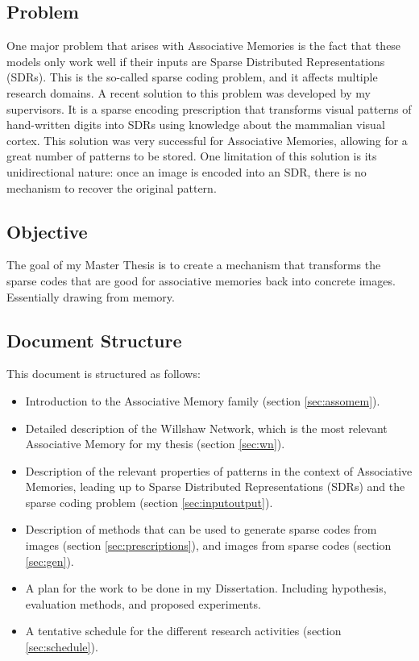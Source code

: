 \documentclass[runningheads]{llncs}
\begin{document}
\subsection{Problem}
\label{sec:intro_prob}
One major problem that arises with Associative Memories is the fact that these models only work well if their inputs are Sparse Distributed Representations (SDRs). This is the so-called sparse coding problem, and it affects multiple research domains. A recent solution to this problem was developed by my supervisors. It is a sparse encoding prescription that transforms visual patterns of hand-written digits into SDRs using knowledge about the mammalian visual cortex. This solution was very successful for Associative Memories, allowing for a great number of patterns to be stored. One limitation of this solution is its unidirectional nature: once an image is encoded into an SDR, there is no mechanism to recover the original pattern.
\subsection{Objective}
\label{sec:intro_obj}
The goal of my Master Thesis is to create a mechanism that transforms the sparse codes that are good for associative memories back into concrete images. Essentially drawing from memory.

\subsection{Document Structure}
\label{sec:intro_struct}
This document is structured as follows:
\begin{itemize}
    \item Introduction to the Associative Memory family (section \ref{sec:assomem}).
    \item Detailed description of the Willshaw Network, which is the most relevant Associative Memory for my thesis (section \ref{sec:wn}).
    \item Description of the relevant properties of patterns in the context of Associative Memories, leading up to Sparse Distributed Representations (SDRs) and the sparse coding problem (section \ref{sec:inputoutput}).
    \item Description of methods that can be used to generate sparse codes from images (section \ref{sec:prescriptions}), and images from sparse codes (section \ref{sec:gen}).
    \item A plan for the work to be done in my Dissertation. Including hypothesis, evaluation methods, and proposed experiments.
    \item A tentative schedule for the different research activities (section \ref{sec:schedule}).
\end{itemize}
\end{document}

